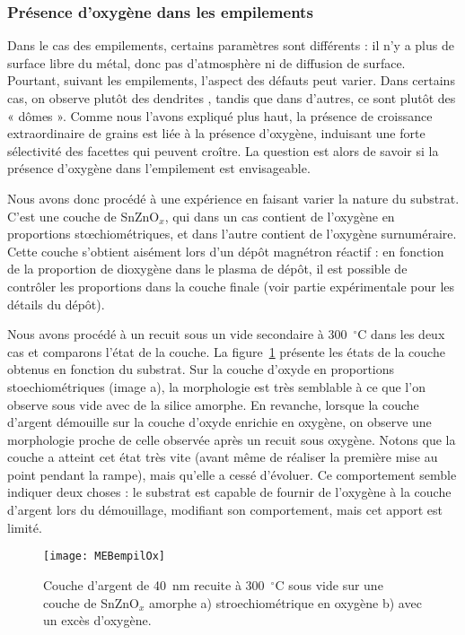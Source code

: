 	\subsubsection{Présence d'oxygène dans les empilements}
Dans le cas des empilements, certains paramètres sont différents : il n’y a plus de surface libre du métal, donc pas d’atmosphère ni de diffusion de surface. Pourtant, suivant les empilements, l’aspect des défauts peut varier. Dans certains cas, on observe plutôt des \og dendrites \fg, tandis que dans d’autres, ce sont plutôt des « dômes ». Comme nous l’avons expliqué plus haut, la présence de croissance extraordinaire de grains est liée à la présence d’oxygène, induisant une forte sélectivité des facettes qui peuvent croître. La question est alors de savoir si la présence d’oxygène dans l’empilement est envisageable.\par 
Nous avons donc procédé à une expérience en faisant varier la nature du substrat. C’est une couche de SnZnO$_x$, qui dans un cas contient de l’oxygène en proportions stœchiométriques, et dans l’autre contient de l’oxygène surnuméraire. Cette couche s’obtient aisément lors d’un dépôt magnétron réactif : en fonction de la proportion de dioxygène dans le plasma de dépôt, il est possible de contrôler les proportions dans la couche finale (voir partie expérimentale pour les détails du dépôt).\par 
Nous avons procédé à un recuit sous un vide secondaire à 300~$^\circ$C dans les deux cas et comparons l’état de la couche. La figure~\ref{MEBempilOx} présente les états de la couche obtenus en fonction du substrat. Sur la couche d’oxyde en proportions stoechiométriques (image a), la morphologie est très semblable à ce que l’on observe sous vide avec de la silice amorphe. En revanche, lorsque la couche d’argent démouille sur la couche d’oxyde enrichie en oxygène, on observe une morphologie proche de celle observée après un recuit sous oxygène. Notons que la couche a atteint cet état très vite (avant même de réaliser la première mise au point pendant la rampe), mais qu’elle a cessé d’évoluer. Ce comportement semble indiquer deux choses : le substrat est capable de fournir de l’oxygène à la couche d’argent lors du démouillage, modifiant son comportement, mais cet apport est limité.\par 
{}
\begin{figure}[!htb]
\centering
\texttt{[image: MEBempilOx]}
\caption{Couche d’argent de 40~nm recuite à 300~$^\circ$C sous vide sur une couche de SnZnO$_x$ amorphe a) stroechiométrique en oxygène b) avec un excès d'oxygène.}
\label{MEBempilOx}
\end{figure}
